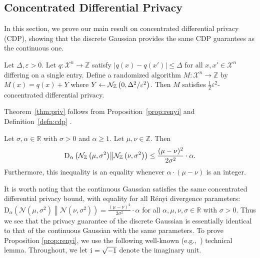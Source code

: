 \documentclass{jpc}
\newcommand{\ii}{\mathrm{i}\mkern1mu}
\newcommand{\dgausss}[2]{{\discN\left(#1,#2\right)}}
\newcommand{\dgauss}[1]{\dgausss{0}{#1}}
\newcommand{\dr}[3]{\mathrm{D}_{#1}\left(#2\middle\|#3\right)}
\newcommand{\eps}{\varepsilon}
\newcommand{\Z}{\mathbb{Z}}
\newcommand{\R}{\mathbb{R}}
\begin{document}
\subsection{Concentrated Differential Privacy}
In this section, we prove our main result on concentrated differential privacy (CDP), showing that the discrete Gaussian provides the same CDP guarantees as the continuous one.
\begin{thm}\label{thm:priv}
Let $\Delta,\eps>0$.
Let $q\colon \mathcal{X}^n \to \Z$ satisfy $|q(x)-q(x')|\le\Delta$ for all $x,x'\in\mathcal{X}^n$ differing on a single entry. Define a randomized algorithm $M\colon \mathcal{X}^n \to \Z$ by $M(x)=q(x)+Y$ where $Y \gets \dgauss{\Delta^2/\eps^2}$. Then $M$ satisfies $\frac12 \eps^2$-concentrated differential privacy.
\end{thm}
\noindent Theorem~\ref{thm:priv} follows from Proposition~\ref{prop:renyi} and Definition~\ref{defn:cdp} .
\begin{prop}\label{prop:renyi}
Let $\sigma,\alpha \in \R$ with $\sigma>0$ and $\alpha \ge 1$. Let $\mu, \nu \in \Z$. Then 
\begin{equation}
\dr{\alpha}{\dgausss{\mu}{\sigma^2}}{\dgausss{\nu}{\sigma^2}}\le \frac{(\mu-\nu)^2}{2\sigma^2}\cdot \alpha.
\end{equation}
Furthermore, this inequality is an equality whenever $\alpha \cdot (\mu - \nu)$ is an integer.
\end{prop}
It is worth noting that the continuous Gaussian satisfies the same concentrated differential privacy bound, with equality for all R\'enyi divergence parameters: $\dr{\alpha}{\mathcal{N}(\mu,\sigma^2)}{\mathcal{N}(\nu,\sigma^2)} = \frac{(\mu-\nu)^2}{2\sigma^2} \cdot \alpha$ for all $\alpha,\mu,\nu,\sigma \in \R$ with $\sigma>0$. Thus we see that the privacy guarantee of the discrete Gaussian is essentially identical to that of the continuous Gaussian with the same parameters. 
To prove Proposition \ref{prop:renyi}, we use the following well-known (e.g.,~\citep{Regev09}) technical lemma. Throughout, we let $\ii{}=\sqrt{-1}$ denote the imaginary unit. 
\end{document}
